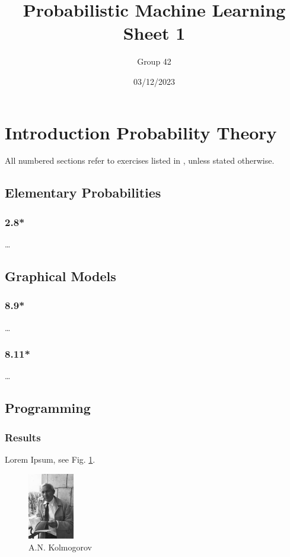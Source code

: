 \documentclass{article}
\title{Probabilistic Machine Learning \\Sheet 1}
\author{Group 42} %
\date{03/12/2023}
\begin{document}
\maketitle
\linenumbers

\section*{Introduction Probability Theory}
All numbered sections refer to exercises listed in \cite{bishop2006pattern}, unless stated otherwise.
\subsection*{Elementary Probabilities}

\subsubsection*{2.8*}
\ldots

\vspace{2em}

\subsection*{Graphical Models}

\subsubsection*{8.9*}
\ldots

\subsubsection*{8.11*}
\ldots


\vspace{2em}

\subsection*{Programming}

\subsubsection*{Results}
Lorem Ipsum, see Fig. \ref{fig:A}. \\
\begin{figure}[htp]
    \centering
    \includegraphics[width=2cm]{figures/Andrej_Nikolajewitsch_Kolmogorov.jpg}
    \caption{A.N. Kolmogorov}
    \label{fig:A}
\end{figure}
\end{document}
